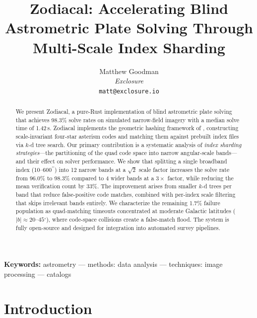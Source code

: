 \documentclass[twocolumn, 10pt]{article}
\newcommand{\arcsec}{\ensuremath{^{\prime\prime}}}
\newcommand{\degr}{\ensuremath{^{\circ}}}
\begin{document}
\title{Zodiacal: Accelerating Blind Astrometric Plate Solving Through\\Multi-Scale Index Sharding}

\author{Matthew Goodman\\
\textit{Exclosure}\\
\texttt{matt@exclosure.io}}

\begin{abstract}
We present Zodiacal, a pure-Rust implementation of blind astrometric plate
solving that achieves 98.3\% solve rates on simulated narrow-field imagery
with a median solve time of 1.42\,s. Zodiacal implements the geometric hashing
framework of \citet{lang2010}, constructing scale-invariant four-star asterism
codes and matching them against prebuilt index files via $k$-d tree search.
Our primary contribution is a systematic analysis of \emph{index sharding
strategies}---the partitioning of the quad code space into narrow angular-scale
bands---and their effect on solver performance. We show that splitting a single
broadband index (10--600\arcsec) into 12 narrow bands at a $\sqrt{2}$ scale
factor increases the solve rate from 96.0\% to 98.3\% compared to 4
wider bands at a $3\times$ factor, while reducing the mean verification
count by 33\%. The improvement arises from smaller $k$-d trees per band
that reduce false-positive code matches, combined with per-index scale
filtering that skips irrelevant bands entirely. We characterize the
remaining 1.7\% failure population as
quad-matching timeouts concentrated at moderate Galactic latitudes
($|b| \approx 20$--$45\degr$), where code-space collisions create a
false-match flood. The system is fully open-source and designed for
integration into automated survey pipelines.
\end{abstract}

\date{}
\maketitle

\noindent\textbf{Keywords:} astrometry --- methods: data analysis --- techniques: image processing --- catalogs

\section{Introduction} \label{sec:intro}
\end{document}
